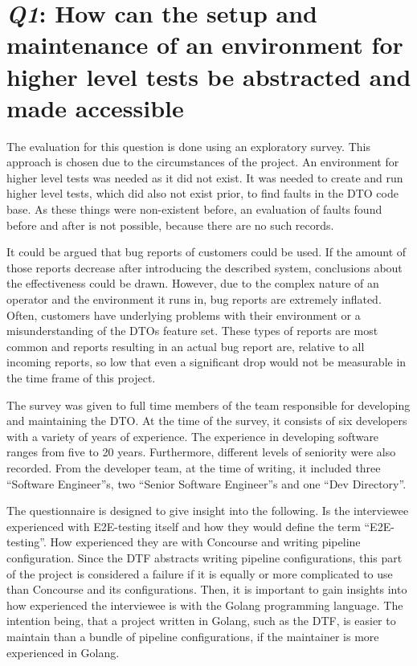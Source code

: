 \section{\textit{Q1}: How can the setup and maintenance of an environment for higher level tests be abstracted and made accessible}\label{sec:textit{q1}:-how-can-the-setup-and-maintenance-of-an-environment-for-higher-level-tests-be-abstracted-and-made-accessible?}

The evaluation for this question is done using an exploratory survey.
This approach is chosen due to the circumstances of the project.
An environment for higher level tests was needed as it did not exist.
It was needed to create and run higher level tests, which did also not exist prior, to find faults in the DTO code base.
As these things were non-existent before, an evaluation of faults found before and after is not possible, because there are no such records.

It could be argued that bug reports of customers could be used.
If the amount of those reports decrease after introducing the described system, conclusions about the effectiveness could be drawn.
However, due to the complex nature of an operator and the environment it runs in, bug reports are extremely inflated.
Often, customers have underlying problems with their environment or a misunderstanding of the DTOs feature set.
These types of reports are most common and reports resulting in an actual bug report are, relative to all incoming reports, so low that even a significant drop would not be measurable in the time frame of this project.

The survey was given to full time members of the team responsible for developing and maintaining the DTO.
At the time of the survey, it consists of six developers with a variety of years of experience.
The experience in developing software ranges from five to 20 years.
Furthermore, different levels of seniority were also recorded.
From the developer team, at the time of writing, it included three ``Software Engineer''s, two ``Senior Software Engineer''s and one ``Dev Directory''.

The questionnaire is designed to give insight into the following.
Is the interviewee experienced with E2E-testing itself and how they would define the term ``E2E-testing''.
How experienced they are with Concourse and writing pipeline configuration.
Since the DTF abstracts writing pipeline configurations, this part of the project is considered a failure if it is equally or more complicated to use than Concourse and its configurations.
Then, it is important to gain insights into how experienced the interviewee is with the Golang programming language.
The intention being, that a project written in Golang, such as the DTF, is easier to maintain than a bundle of pipeline configurations, if the maintainer is more experienced in Golang.

